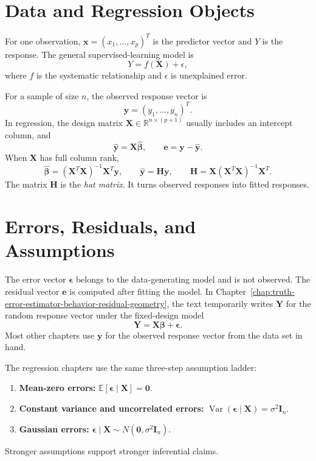 {\section*{Data and Regression Objects}

For one observation, $\mathbf{x}=(x_1,\ldots,x_p)^T$ is the predictor vector and $Y$ is the response.  The general supervised-learning model is
\[
  Y=f(\mathbf{X})+\epsilon,
\]
where $f$ is the systematic relationship and $\epsilon$ is unexplained error.

For a sample of size $n$, the observed response vector is
\[
  \mathbf{y}=(y_1,\ldots,y_n)^T.
\]
In regression, the design matrix $\mathbf{X}\in\mathbb{R}^{n\times(p+1)}$ usually includes an intercept column, and
\[
  \widehat{\mathbf{y}}=\mathbf{X}\widehat{\boldsymbol{\beta}},
  \qquad
  \mathbf{e}=\mathbf{y}-\widehat{\mathbf{y}}.
\]
When $\mathbf{X}$ has full column rank,
\[
  \widehat{\boldsymbol{\beta}}
  =(\mathbf{X}^T\mathbf{X})^{-1}\mathbf{X}^T\mathbf{y},
  \qquad
  \widehat{\mathbf{y}}=\mathbf{H}\mathbf{y},
  \qquad
  \mathbf{H}=\mathbf{X}(\mathbf{X}^T\mathbf{X})^{-1}\mathbf{X}^T.
\]
The matrix $\mathbf{H}$ is the \emph{hat matrix}.  It turns observed responses into fitted responses.

\section*{Errors, Residuals, and Assumptions}

The error vector $\boldsymbol{\epsilon}$ belongs to the data-generating model and is not observed.  The residual vector $\mathbf{e}$ is computed after fitting the model.  In Chapter~\ref{chap:truth-error-estimator-behavior-residual-geometry}, the text temporarily writes $\mathbf{Y}$ for the random response vector under the fixed-design model
\[
  \mathbf{Y}=\mathbf{X}\boldsymbol{\beta}+\boldsymbol{\epsilon}.
\]
Most other chapters use $\mathbf{y}$ for the observed response vector from the data set in hand.

The regression chapters use the same three-step assumption ladder:
\begin{enumerate}
  \item \textbf{Mean-zero errors:} $\mathbb{E}[\boldsymbol{\epsilon}\mid\mathbf{X}]=\mathbf{0}$.
  \item \textbf{Constant variance and uncorrelated errors:} $\operatorname{Var}(\boldsymbol{\epsilon}\mid\mathbf{X})=\sigma^2\mathbf{I}_n$.
  \item \textbf{Gaussian errors:} $\boldsymbol{\epsilon}\mid\mathbf{X}\sim N(\mathbf{0},\sigma^2\mathbf{I}_n)$.
\end{enumerate}
Stronger assumptions support stronger inferential claims.

}

